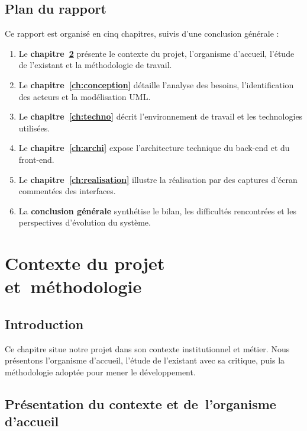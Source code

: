 \documentclass[11pt,a4paper,oneside]{report}
\renewcommand{\thechapter}{\arabic{chapter}}
\begin{document}
\section{Plan du rapport}

Ce rapport est organisé en cinq chapitres, suivis d'une conclusion générale :

\begin{enumerate}[leftmargin=1.4em, itemsep=0.4em, parsep=0pt, topsep=0.35em]
  \item Le \textbf{chapitre~\ref{ch:contexte}} présente le contexte du projet, l'organisme d'accueil, l'étude de l'existant et la méthodologie de travail.
  \item Le \textbf{chapitre~\ref{ch:conception}} détaille l'analyse des besoins, l'identification des acteurs et la modélisation UML.
  \item Le \textbf{chapitre~\ref{ch:techno}} décrit l'environnement de travail et les technologies utilisées.
  \item Le \textbf{chapitre~\ref{ch:archi}} expose l'architecture technique du back-end et du front-end.
  \item Le \textbf{chapitre~\ref{ch:realisation}} illustre la réalisation par des captures d'écran commentées des interfaces.
  \item La \textbf{conclusion générale} synthétise le bilan, les difficultés rencontrées et les perspectives d'évolution du système.
\end{enumerate}

\renewcommand{\thesection}{\thechapter.\arabic{section}}
\chapter{Contexte du projet et~méthodologie}
\label{ch:contexte}

\section{Introduction}

Ce chapitre situe notre projet dans son contexte institutionnel et métier. Nous présentons l'organisme d'accueil, l'étude de l'existant avec sa critique, puis la méthodologie adoptée pour mener le développement.

\section{Présentation du contexte et de~l'organisme d'accueil}
\end{document}
